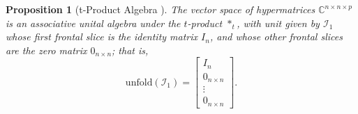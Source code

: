 \documentclass[11pt]{article}
\newtheorem{proposition}[theorem]{Proposition}
\begin{document}
\begin{proposition}[t-Product Algebra \cite{kilmer2011factorization}]
    The vector space of hypermatrices $\mathbb{C}^{n\times n\times p}$ is an associative unital algebra under the $t$-product $*_t$, with unit given by $\mathcal{I}_1$ whose first frontal slice is the identity matrix $I_n$, and whose other frontal slices are the zero matrix $0_{n\times n}$; that is, 
    \[\mathrm{unfold}(\mathcal{I}_1) = \left[\begin{array}{c}
        I_n \\
        0_{n\times n} \\
        \vdots \\
        0_{n\times n}
    \end{array}\right].\]
\end{proposition}
\end{document}
